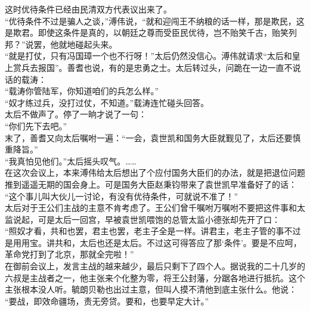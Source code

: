 这时优待条件已经由民清双方代表议出来了。\\

“优待条件不过是骗人之谈，”溥伟说，“就和迎闯王不纳粮的话一样，那是欺民，这是欺君。即使这条件是真的，以朝廷之尊而受臣民优待，岂不贻笑千古，贻笑列邦？”说罢，他就地碰起头来。\\

“就是打仗，只有冯国璋一个也不行呀！”太后仍然没信心。溥伟就请求“太后和皇上赏兵去报国”。善耆也说，有的是忠勇之士。太后转过头，问跪在一边一直不说话的载涛：\\

“载涛你管陆军，你知道咱们的兵怎么样。”\\

“奴才练过兵，没打过仗，不知道。”载涛连忙碰头回答。\\

太后不做声了。停了一晌才说了一句：\\

“你们先下去吧。”\\

末了，善耆又向太后嘱咐一遍：“一会，袁世凯和国务大臣就觐见了，太后还要慎重降旨。”\\

“我真怕见他们。”太后摇头叹气。……\\

在这次会议上，本来溥伟给太后想出了个应付国务大臣们的办法，就是把退位问题推到遥遥无期的国会身上。可是国务大臣赵秉钧带来了袁世凯早准备好了的话：\\

“这个事儿叫大伙儿一讨论，有没有优待条件，可就说不准了！”\\

太后对于王公们主战的主意不肯考虑了。王公们曾千嘱咐万嘱咐不要把这件事和太监说起，可是太后一回宫，早被袁世凯喂饱的总管太监小德张却先开了口：\\

“照奴才看，共和也罢，君主也罢，老主子全是一样。讲君主，老主子管的事不过是用用宝。讲共和，太后也还是太后。不过这可得答应了那‘条件’。要是不应呵，革命党打到了北京，那就全完啦！”\\

在御前会议上，发言主战的越来越少，最后只剩下了四个人。据说我的二十几岁的六叔是主战者之一，他主张来个化整为零，将王公封藩，分踞各地进行抵抗。这个主张根本没人听。毓朗贝勒也出过主意，但叫人摸不清他到底主张什么。他说：\\

“要战，即效命疆场，责无旁贷。要和，也要早定大计。”\\

